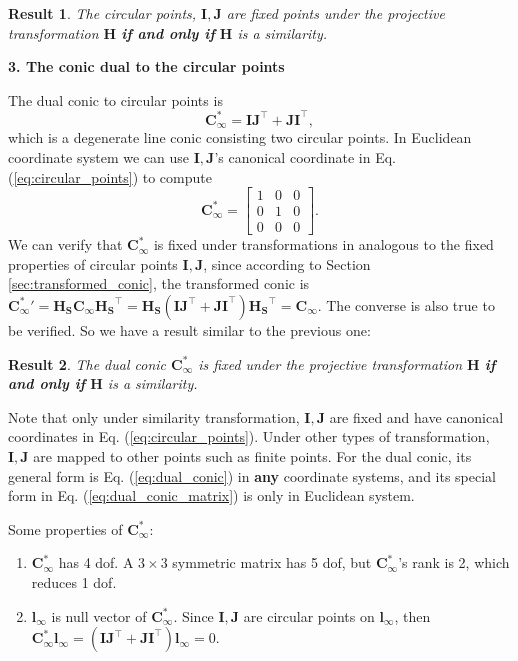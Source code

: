 \documentclass[12pt]{article}
\newtheorem{result}{Result}[section]
\numberwithin{equation}{section}
\begin{document}
\begin{result}
The circular points, $\mathbf{I, J}$ are fixed points under the projective transformation $\mathbf{H}$ \textbf{if and only if} $\mathbf{H}$ is a similarity.
\label{res:circular_points}
\end{result} 


\textbf{3. The conic dual to the circular points}

The dual conic to circular points is 
\begin{equation}
\mathbf{C}_{\infty}^* = \mathbf{IJ^\top + JI^\top},
\label{eq:dual_conic}
\end{equation}
which is a degenerate line conic consisting two circular points. In Euclidean coordinate system we can use $\mathbf{I,J}$'s canonical coordinate in Eq. (\ref{eq:circular_points}) to compute 
\begin{equation}
\mathbf{C}_{\infty}^* = 
\begin{bmatrix}
1 & 0 & 0\\
0 & 1 & 0\\
0 & 0 & 0
\end{bmatrix}.
\label{eq:dual_conic_matrix}
\end{equation}
We can verify that $\mathbf{C}_{\infty}^*$ is fixed under 
transformations in analogous to the fixed properties of circular points $\mathbf{I, J}$, since according to Section \ref{sec:transformed_conic}, the transformed conic is ${\mathbf{C}_{\infty}^{*}}'= \mathbf{H_S}\mathbf{C}_{\infty}\mathbf{H_S}^\top = \mathbf{H_S}(\mathbf{IJ^\top + JI^\top})\mathbf{H_S}^\top = \mathbf{C}_{\infty}$. The converse is also true to be verified. So we have a result similar to the previous one: \\

\begin{result}
The dual conic $\mathbf{C}_{\infty}^*$ is fixed under the projective transformation $\mathbf{H}$ \textbf{if and only if} $\mathbf{H}$ is a similarity.
\label{res:dual_conic}
\end{result}

Note that only under similarity transformation, $\mathbf{I, J}$ are fixed and have canonical coordinates in Eq. (\ref{eq:circular_points}). Under other types of transformation, $\mathbf{I, J}$ are mapped to other points such as finite points. For the dual conic, its general form is Eq. (\ref{eq:dual_conic}) in \textbf{any} coordinate systems, and its special form in Eq. (\ref{eq:dual_conic_matrix}) is only in Euclidean system.

Some properties of $\mathbf{C}_{\infty}^*$: 
\begin{enumerate}
\item $\mathbf{C}_{\infty}^*$ has 4 dof. A $3\times 3$ symmetric matrix has 5 dof, but $\mathbf{C}_{\infty}^*$'s rank is 2, which reduces 1 dof.
\item $\mathbf{l}_{\infty}$ is null vector of $\mathbf{C}_{\infty}^*$. Since $\mathbf{I,J}$ are circular points on $\mathbf{l}_{\infty}$, then $\mathbf{C}_{\infty}^* \mathbf{l}_{\infty} = (\mathbf{IJ^\top + JI^\top})\mathbf{l}_{\infty} = 0$.
\end{enumerate}
\end{document}

